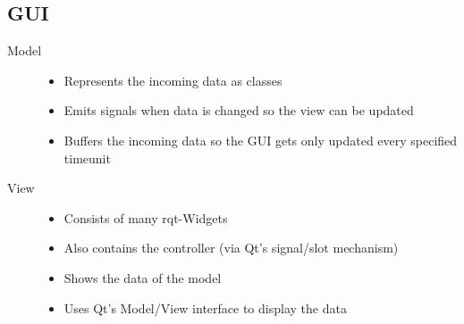 \subsection{GUI}

\begin{description}
	\item[Model] \mbox{}	
		\begin{itemize}
		\item Represents the incoming data as classes
		\item Emits signals when data is changed so the view can be updated
		\item Buffers the incoming data so the GUI gets only updated every specified timeunit
		\end{itemize}
	\item[View] \mbox{}
		\begin{itemize}
		\item Consists of many rqt-Widgets
		\item Also contains the controller (via Qt's signal/slot mechanism)
		\item Shows the data of the model
		\item Uses Qt's Model/View interface to display the data
		\end{itemize}
\end{description}